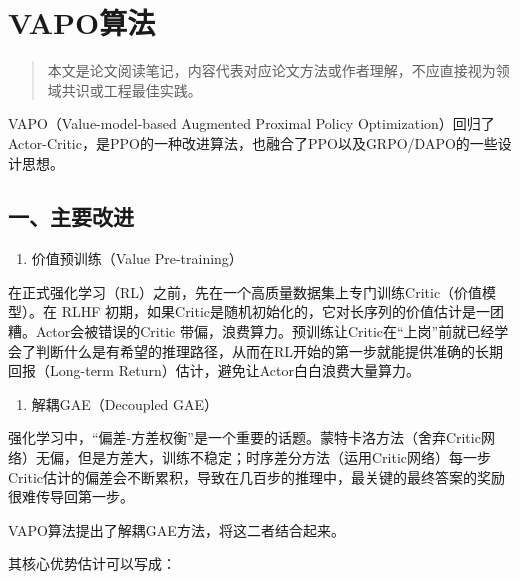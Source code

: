 \setcounter{section}{1}

\hypertarget{vapoux7b97ux6cd5}{%
\section{VAPO算法}\label{vapoux7b97ux6cd5}}

\begin{quote}
本文是论文阅读笔记，内容代表对应论文方法或作者理解，不应直接视为领域共识或工程最佳实践。
\end{quote}

VAPO（Value-model-based Augmented Proximal Policy Optimization）回归了Actor-Critic，是PPO的一种改进算法，也融合了PPO以及GRPO/DAPO的一些设计思想。

\hypertarget{ux4e00ux4e3bux8981ux6539ux8fdb}{%
\subsection{一、主要改进}\label{ux4e00ux4e3bux8981ux6539ux8fdb}}

\begin{enumerate}
\def\labelenumi{\arabic{enumi}.}
\tightlist
\item
  价值预训练（Value Pre-training）
\end{enumerate}

在正式强化学习（RL）之前，先在一个高质量数据集上专门训练Critic（价值模型）。在 RLHF 初期，如果Critic是随机初始化的，它对长序列的价值估计是一团糟。Actor会被错误的Critic 带偏，浪费算力。预训练让Critic在``上岗''前就已经学会了判断什么是有希望的推理路径，从而在RL开始的第一步就能提供准确的长期回报（Long-term Return）估计，避免让Actor白白浪费大量算力。

\begin{enumerate}
\def\labelenumi{\arabic{enumi}.}
\setcounter{enumi}{1}
\tightlist
\item
  解耦GAE（Decoupled GAE）
\end{enumerate}

强化学习中，``偏差-方差权衡''是一个重要的话题。蒙特卡洛方法（舍弃Critic网络）无偏，但是方差大，训练不稳定；时序差分方法（运用Critic网络）每一步Critic估计的偏差会不断累积，导致在几百步的推理中，最关键的最终答案的奖励很难传导回第一步。

VAPO算法提出了解耦GAE方法，将这二者结合起来。

其核心优势估计可以写成：

